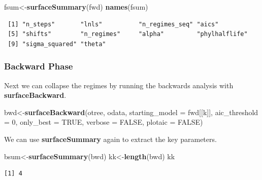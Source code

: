 \documentclass[
]{book}
\newenvironment{Shaded}{\begin{snugshade}}{\end{snugshade}}
\newcommand{\DataTypeTok}[1]{\textcolor[rgb]{0.13,0.29,0.53}{#1}}
\newcommand{\DecValTok}[1]{\textcolor[rgb]{0.00,0.00,0.81}{#1}}
\newcommand{\KeywordTok}[1]{\textcolor[rgb]{0.13,0.29,0.53}{\textbf{#1}}}
\newcommand{\NormalTok}[1]{#1}
\newcommand{\OperatorTok}[1]{\textcolor[rgb]{0.81,0.36,0.00}{\textbf{#1}}}
\newcommand{\OtherTok}[1]{\textcolor[rgb]{0.56,0.35,0.01}{#1}}
\begin{document}
\begin{Shaded}
\begin{Highlighting}[]
\NormalTok{fsum\textless{}{-}}\KeywordTok{surfaceSummary}\NormalTok{(fwd)}
\KeywordTok{names}\NormalTok{(fsum)}
\end{Highlighting}
\end{Shaded}

\begin{verbatim}
 [1] "n_steps"       "lnls"          "n_regimes_seq" "aics"         
 [5] "shifts"        "n_regimes"     "alpha"         "phylhalflife" 
 [9] "sigma_squared" "theta"        
\end{verbatim}

\hypertarget{backward-phase}{%
\subsubsection{Backward Phase}\label{backward-phase}}

Next we can collapse the regimes by running the backwards analysis with \textbf{surfaceBackward}.

\begin{Shaded}
\begin{Highlighting}[]
\NormalTok{bwd\textless{}{-}}\KeywordTok{surfaceBackward}\NormalTok{(otree, odata, }\DataTypeTok{starting\_model =}\NormalTok{ fwd[[k]], }
                     \DataTypeTok{aic\_threshold =} \DecValTok{0}\NormalTok{, }\DataTypeTok{only\_best =} \OtherTok{TRUE}\NormalTok{, }
                     \DataTypeTok{verbose =} \OtherTok{FALSE}\NormalTok{, }\DataTypeTok{plotaic =} \OtherTok{FALSE}\NormalTok{)}
\end{Highlighting}
\end{Shaded}

We can use \textbf{surfaceSummary} again to extract the key parameters.

\begin{Shaded}
\begin{Highlighting}[]
\NormalTok{bsum\textless{}{-}}\KeywordTok{surfaceSummary}\NormalTok{(bwd)}
\NormalTok{kk\textless{}{-}}\KeywordTok{length}\NormalTok{(bwd)}
\NormalTok{kk}
\end{Highlighting}
\end{Shaded}

\begin{verbatim}
[1] 4
\end{verbatim}

\begin{Shaded}
\end{Shaded}
\end{document}
